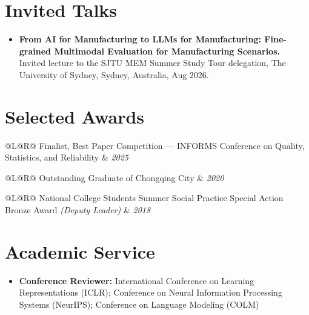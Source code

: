 \documentclass[11pt, a4paper]{article}
\makeatletter
\newcommand{\edentry}[4]{%
  \begin{tabularx}{\textwidth}{@{}L@{\hspace{6pt}}R@{}}
    \textbf{#1} & \textit{\small #2} \\
  \end{tabularx}\par
  \textit{\small #3}\par
  \vspace{1pt}
  {\small\textit{Research: }#4}
  \vspace{3pt}
}
\newcommand{\awardentry}[2]{%
  \begin{tabularx}{\textwidth}{@{}L@{\hspace{6pt}}R@{}}
    #1 & \textit{\small #2} \\
  \end{tabularx}\par
  \vspace{1pt}
}
\makeatother
\begin{document}
\section{Invited Talks}

\begin{itemize}
  \item \textbf{From AI for Manufacturing to LLMs for Manufacturing: Fine-grained Multimodal
    Evaluation for Manufacturing Scenarios.}\\
    Invited lecture to the SJTU MEM Summer Study Tour delegation,
    The University of Sydney, Sydney, Australia, Aug 2026.
\end{itemize}

\section{Selected Awards}

\awardentry{Finalist, Best Paper Competition — INFORMS Conference on Quality, Statistics,
  and Reliability}{2025}

\awardentry{Outstanding Graduate of Chongqing City}{2020}

\awardentry{National College Students Summer Social Practice Special Action
  Bronze Award \textit{(Deputy Leader)}}{2018}

\section{Academic Service}

\begin{itemize}
  \item \textbf{Conference Reviewer:} International Conference on Learning Representations (ICLR);
    Conference on Neural Information Processing Systems (NeurIPS);
    Conference on Language Modeling (COLM)
\end{itemize}



\end{document}
